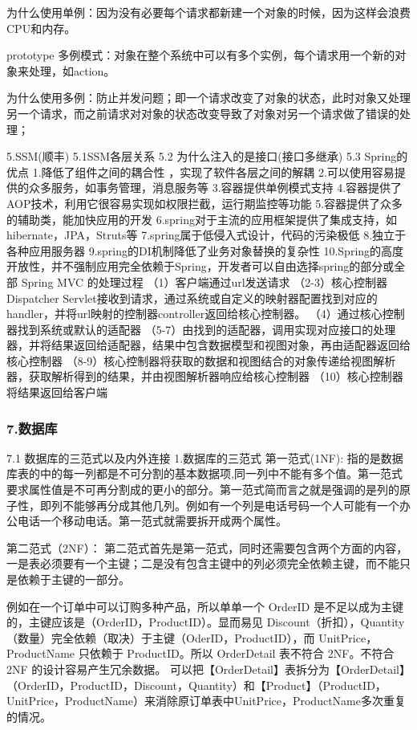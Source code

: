 \documentclass[UTF8]{ctexart}
\begin{document}
为什么使用单例：因为没有必要每个请求都新建一个对象的时候，因为这样会浪费CPU和内存。

prototype 多例模式：对象在整个系统中可以有多个实例，每个请求用一个新的对象来处理，如action。

为什么使用多例：防止并发问题；即一个请求改变了对象的状态，此时对象又处理另一个请求，而之前请求对对象的状态改变导致了对象对另一个请求做了错误的处理；

5.SSM(顺丰)
5.1SSM各层关系
5.2 为什么注入的是接口(接口多继承)
5.3 Spring的优点
1.降低了组件之间的耦合性 ，实现了软件各层之间的解耦
2.可以使用容易提供的众多服务，如事务管理，消息服务等
3.容器提供单例模式支持
4.容器提供了AOP技术，利用它很容易实现如权限拦截，运行期监控等功能
5.容器提供了众多的辅助类，能加快应用的开发
6.spring对于主流的应用框架提供了集成支持，如hibernate，JPA，Struts等
7.spring属于低侵入式设计，代码的污染极低
8.独立于各种应用服务器
9.spring的DI机制降低了业务对象替换的复杂性
10.Spring的高度开放性，并不强制应用完全依赖于Spring，开发者可以自由选择spring的部分或全部
Spring MVC 的处理过程
（1）客户端通过url发送请求
（2-3）核心控制器Dispatcher Servlet接收到请求，通过系统或自定义的映射器配置找到对应的handler，并将url映射的控制器controller返回给核心控制器。
（4）通过核心控制器找到系统或默认的适配器
（5-7）由找到的适配器，调用实现对应接口的处理器，并将结果返回给适配器，结果中包含数据模型和视图对象，再由适配器返回给核心控制器
（8-9）核心控制器将获取的数据和视图结合的对象传递给视图解析器，获取解析得到的结果，并由视图解析器响应给核心控制器
（10）核心控制器将结果返回给客户端
\subsubsection{7.数据库}
7.1 数据库的三范式以及内外连接
1.数据库的三范式
第一范式(1NF):
指的是数据库表的中的每一列都是不可分割的基本数据项,同一列中不能有多个值。第一范式要求属性值是不可再分割成的更小的部分。第一范式简而言之就是强调的是列的原子性，即列不能够再分成其他几列。例如有一个列是电话号码一个人可能有一个办公电话一个移动电话。第一范式就需要拆开成两个属性。

第二范式（2NF）：
第二范式首先是第一范式，同时还需要包含两个方面的内容，一是表必须要有一个主键；二是没有包含主键中的列必须完全依赖主键，而不能只是依赖于主键的一部分。

例如在一个订单中可以订购多种产品，所以单单一个 OrderID 是不足以成为主键的，主键应该是（OrderID，ProductID）。显而易见 Discount（折扣），Quantity（数量）完全依赖（取决）于主键（OderID，ProductID），而 UnitPrice，ProductName 只依赖于 ProductID。所以 OrderDetail 表不符合 2NF。不符合 2NF 的设计容易产生冗余数据。 可以把【OrderDetail】表拆分为【OrderDetail】（OrderID，ProductID，Discount，Quantity）和【Product】（ProductID，UnitPrice，ProductName）来消除原订单表中UnitPrice，ProductName多次重复的情况。
\end{document}
